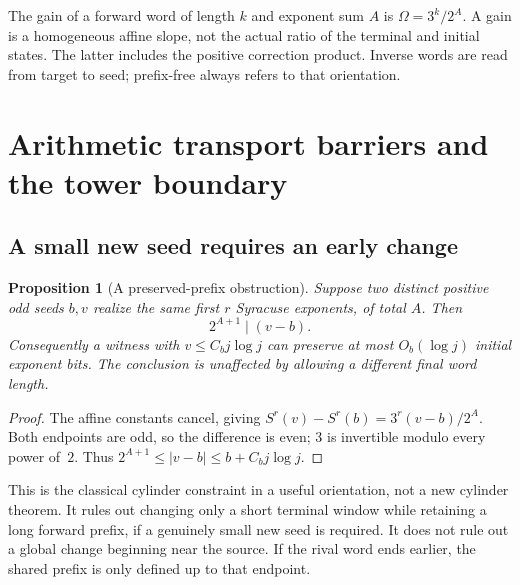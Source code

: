 \documentclass[11pt,a4paper]{article}
\newtheorem{proposition}[theorem]{Proposition}
\theoremstyle{definition}
\begin{document}
The gain of a forward word of length $k$ and exponent sum $A$ is
$\Omega=3^k/2^A$. A gain is a homogeneous affine slope, not the
actual ratio of the terminal and initial states. The latter includes
the positive correction product. Inverse words are read from target
to seed; prefix-free always refers to that orientation.



\section{Arithmetic transport barriers and the tower boundary}
\label{sec:transport-barriers}

\subsection{A small new seed requires an early change}
\begin{proposition}[A preserved-prefix obstruction]
Suppose two distinct positive odd seeds $b,v$ realize the same first
$r$ Syracuse exponents, of total $A$. Then
\[
 2^{A+1}\mid(v-b).
\]
Consequently a witness with $v\le C_b j\log j$ can preserve at most
$O_b(\log j)$ initial exponent bits. The conclusion is unaffected
by allowing a different final word length.
\end{proposition}
\begin{proof}
The affine constants cancel, giving
$S^r(v)-S^r(b)=3^r(v-b)/2^A$. Both endpoints are odd, so the
difference is even; $3$ is invertible modulo every power of~$2$.
Thus $2^{A+1}\le |v-b|\le b+C_b j\log j$.
\end{proof}
This is the classical cylinder constraint in a useful orientation, not
a new cylinder theorem. It rules out changing only a short terminal
window while retaining a long forward prefix, if a genuinely small
new seed is required. It does not rule out a global change beginning
near the source. If the rival word ends earlier, the shared prefix is
only defined up to that endpoint.
\end{document}
